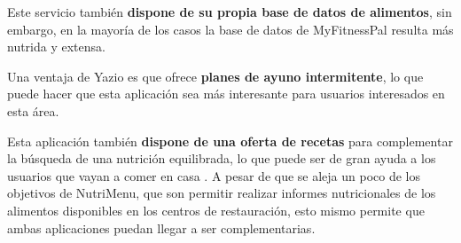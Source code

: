 Este servicio también \textbf{dispone de su propia base de datos de alimentos}, sin embargo, en la mayoría de los casos la base de datos de MyFitnessPal resulta más nutrida y extensa.

Una ventaja de Yazio es que ofrece \textbf{planes de ayuno intermitente}, lo que puede hacer que esta aplicación sea más interesante para usuarios interesados en esta área.

Esta aplicación también \textbf{dispone de una oferta de recetas} para complementar la búsqueda de una nutrición equilibrada, lo que puede ser de gran ayuda a los usuarios que vayan a comer en casa \cite{yazio:main}. A pesar de que se aleja un poco de los objetivos de NutriMenu, que son permitir realizar informes nutricionales de los alimentos disponibles en los centros de restauración, esto mismo permite que ambas aplicaciones puedan llegar a ser complementarias.